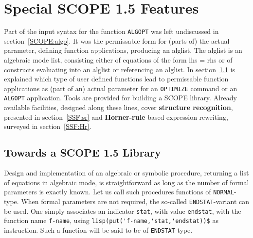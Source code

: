 \section{Special SCOPE 1.5 Features}\label{SCOPE:soph}

Part of the input syntax for the function {\tt ALGOPT} was left undiscussed
in section~\ref{SCOPE:algo}. It was the permissable form for (parts of) 
the actual parameter, defining function applications, producing 
an alglist. The alglist is an algebraic mode list, consisting 
either of equations of the form lhs = rhs or of constructs 
evaluating into an alglist or referencing an alglist.
In section~\ref{SSF:Sl} is explained which type of user defined
functions lead to permissable function applications as (part of an) actual 
parameter for an {\tt OPTIMIZE} command or an {\tt ALGOPT} application.
Tools are provided for building a SCOPE library.
Already available facilities, designed along these lines, cover
{\bf structure recognition}, presented in section~\ref{SSF:sr} and
{\bf Horner-rule} based expression rewriting, surveyed in section~\ref{SSF:Hr}.

\subsection{Towards a SCOPE 1.5 Library}\label{SSF:Sl}

Design and implementation of an algebraic or symbolic procedure, returning
a list of equations in algebraic mode, is straightforward as long as the 
number of formal parameters is exactly known. Let us call such procedures
functions of {\tt NORMAL}-type. When formal parameters are not required, 
the so-called {\tt ENDSTAT}-variant can be used.
One simply associates an indicator {\tt stat}, with
value {\tt endstat}, with the function name {\tt f-name},
using \verb+lisp(put('f-name,'stat,'endstat))$+ as instruction. 
Such a function will be said to be of {\tt ENDSTAT}-type.

